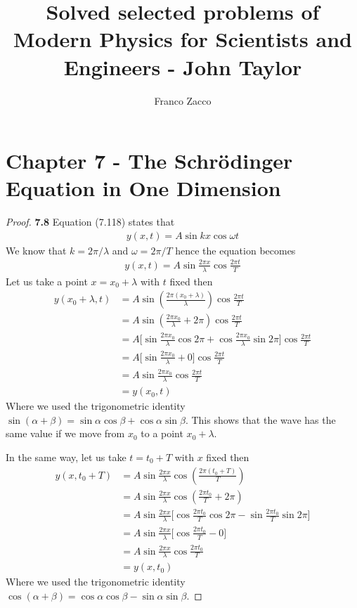 \documentclass[11pt]{article}
\title{\textbf{Solved selected problems of Modern Physics for Scientists and Engineers - John Taylor}}
\author{Franco Zacco}
\date{}
\theoremstyle{definition}
\begin{document}
\maketitle
\thispagestyle{empty}

\section*{Chapter 7 - The Schrödinger Equation in One Dimension}

\begin{proof}{\textbf{7.8}}
    Equation (7.118) states that
    \begin{align*}
        y(x,t) = A\sin kx\cos\omega t
    \end{align*}
    We know that $k = 2\pi/\lambda$ and $\omega = 2\pi/T$ hence the equation
    becomes
    \begin{align*}
        y(x,t) = A\sin \frac{2\pi x}{\lambda}\cos \frac{2\pi t}{T}
    \end{align*}
    Let us take a point $x = x_0 + \lambda$ with $t$ fixed then
    \begin{align*}
        y(x_0 + \lambda,t)
        &= A\sin \left(\frac{2\pi (x_0 + \lambda)}{\lambda}\right)
        \cos \frac{2\pi t}{T}\\
        &=  A\sin \left(\frac{2\pi x_0}{\lambda} + 2\pi\right)
        \cos \frac{2\pi t}{T}\\
        &=  A\bigg[\sin \frac{2\pi x_0}{\lambda}\cos 2\pi
        + \cos \frac{2\pi x_0}{\lambda}\sin 2\pi \bigg]
        \cos \frac{2\pi t}{T}\\
        &=  A\bigg[\sin \frac{2\pi x_0}{\lambda} + 0 \bigg]
        \cos \frac{2\pi t}{T}\\
        &=  A\sin \frac{2\pi x_0}{\lambda}\cos \frac{2\pi t}{T}\\
        &= y(x_0,t)
    \end{align*}
    Where we used the trigonometric identity
    $\sin(\alpha + \beta) = \sin\alpha\cos\beta + \cos\alpha\sin\beta$.
    This shows that the wave has the same value if we move from $x_0$
    to a point $x_0 + \lambda$.

    In the same way, let us take $t = t_0 + T$ with $x$ fixed then
    \begin{align*}
        y(x, t_0 + T)
        &= A\sin \frac{2\pi x}{\lambda}
        \cos \left(\frac{2\pi (t_0 + T)}{T}\right)\\
        &= A\sin \frac{2\pi x}{\lambda}
        \cos \left(\frac{2\pi t_0}{T} + 2\pi\right)\\
        &= A\sin \frac{2\pi x}{\lambda}
        \bigg[\cos\frac{2\pi t_0}{T}\cos 2\pi - \sin\frac{2\pi t_0}{T}\sin 2\pi\bigg]\\
        &= A\sin \frac{2\pi x}{\lambda}\bigg[\cos\frac{2\pi t_0}{T} - 0\bigg]\\
        &= A\sin \frac{2\pi x}{\lambda}\cos\frac{2\pi t_0}{T}\\
        &= y(x, t_0)
    \end{align*}
    Where we used the trigonometric identity
    $\cos(\alpha + \beta) = \cos\alpha\cos\beta - \sin\alpha\sin\beta$.
\end{proof}
\end{document}
